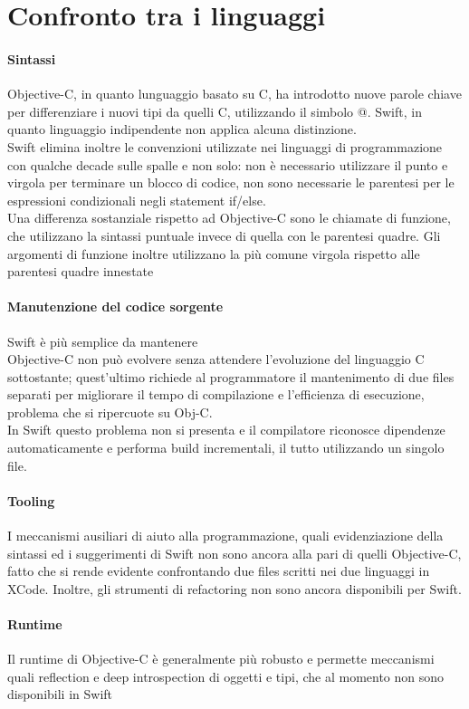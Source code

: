 \chapter{Confronto tra i linguaggi}
\subsubsection{Sintassi}
Objective-C, in quanto lunguaggio basato su C, ha introdotto nuove parole chiave per differenziare i nuovi tipi da quelli C, utilizzando il simbolo @. Swift, in quanto linguaggio indipendente non applica alcuna distinzione.\\
Swift elimina inoltre le convenzioni utilizzate nei linguaggi di programmazione con qualche decade sulle spalle e non solo: non è necessario utilizzare il punto e virgola per terminare un blocco di codice, non sono necessarie le parentesi per le espressioni condizionali negli statement if/else.\\
Una differenza sostanziale rispetto ad Objective-C sono le chiamate di funzione, che utilizzano la sintassi puntuale invece di quella con le parentesi quadre. Gli argomenti di funzione inoltre utilizzano la più comune virgola rispetto alle parentesi quadre innestate
\subsubsection{Manutenzione del codice sorgente}
Swift è più semplice da mantenere\\
Objective-C non può evolvere senza attendere l'evoluzione del linguaggio C sottostante; quest'ultimo richiede al programmatore il mantenimento di due files separati per migliorare il tempo di compilazione e l'efficienza di esecuzione, problema che si ripercuote su Obj-C.\\
In Swift questo problema non si presenta e il compilatore riconosce dipendenze automaticamente e performa build incrementali, il tutto utilizzando un singolo file.
\subsubsection{Tooling}
I meccanismi ausiliari di aiuto alla programmazione, quali evidenziazione della sintassi ed i suggerimenti di Swift non sono ancora alla pari di quelli Objective-C, fatto che si rende evidente confrontando due files scritti nei due linguaggi in XCode. Inoltre, gli strumenti di refactoring non sono ancora disponibili per Swift.
\subsubsection{Runtime}
Il runtime di Objective-C è generalmente più robusto e permette meccanismi quali reflection e deep introspection di oggetti e tipi, che al momento non sono disponibili in Swift

